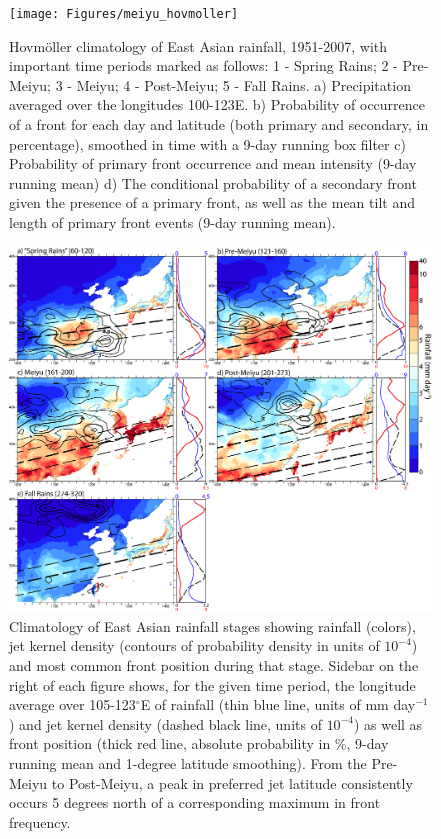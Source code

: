 \documentclass[draft,grl]{AGUTeX}
\begin{document}
\begin{figure}
\label{hov}
\noindent\texttt{[image: Figures/meiyu\_hovmoller]}
\caption{Hovm\"oller climatology of East Asian rainfall, 1951-2007, with important time periods marked as follows: 1 - Spring Rains; 2 - Pre-Meiyu; 3 - Meiyu; 4 - Post-Meiyu; 5 - Fall Rains. a) Precipitation averaged over the longitudes 100-123\textdegree E. b) Probability of occurrence of a front for each day and latitude (both primary and secondary, in percentage), smoothed in time with a 9-day running box filter c) Probability of primary front occurrence and mean intensity (9-day running mean) d) The conditional probability of a secondary front given the presence of a primary front, as well as the mean tilt and length of primary front events (9-day running mean).}
\end{figure}

\begin{figure}
\label{climo}
\noindent\includegraphics[width=36pc]{Figures/climo}
\caption{Climatology of East Asian rainfall stages showing rainfall (colors), jet kernel density (contours of probability density in units of $10^{-4}$) and most common front position during that stage. Sidebar on the right of each figure shows, for the given time period, the longitude average over 105-123$^{\circ}$E of rainfall (thin blue line, units of mm day$^{-1}$) and jet kernel density (dashed black line, units of $10^{-4}$) as well as front position (thick red line, absolute probability in \%, 9-day running mean and 1-degree latitude smoothing). From the Pre-Meiyu to Post-Meiyu, a peak in preferred jet latitude consistently occurs 5 degrees north of a corresponding maximum in front frequency.}
\end{figure}
\end{document}
